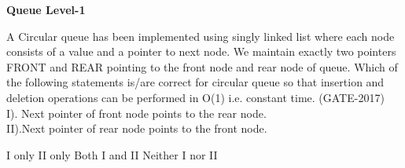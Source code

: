 
\centerline{\textbf{ \LARGE Queue Level-1}}


\begin{questyle}
  \question  A Circular queue has been implemented using singly linked list where each node consists of a value and
             a pointer to next node. We maintain exactly two pointers FRONT and REAR pointing to the front node and
             rear node of queue. Which of the following statements is/are correct for circular queue so that insertion
             and deletion operations can be performed in O(1) i.e. constant time. (GATE-2017) \\
             I). Next pointer of front node points to the rear node. \\
             II).Next pointer of rear node points to the front node.

  \begin{choices}
    \choice         I only
    \CorrectChoice  II only
    \choice         Both I and II
    \choice         Neither I nor II
  \end{choices}
\end{questyle}
